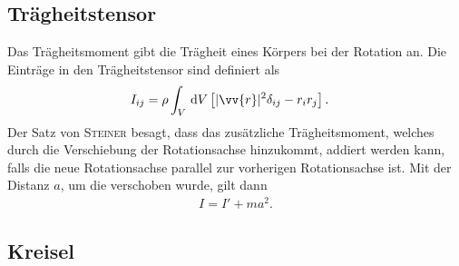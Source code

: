 \subsection{Trägheitstensor}
Das Trägheitsmoment gibt die Trägheit eines Körpers bei der Rotation an.
Die Einträge in den Trägheitstensor sind definiert als
\begin{align} 
        I_{ij}&=\rho \int_{V}^{}\td V\left[|\vv{r}|^2\delta _{ij}-r_ir_j\right]
.\end{align} 
Der Satz von \textsc{Steiner} besagt, dass das zusätzliche Trägheitsmoment, welches durch die Verschiebung der Rotationsachse hinzukommt, addiert werden kann, falls die neue Rotationsachse parallel zur vorherigen Rotationsachse ist.
Mit der Distanz $a$, um die verschoben wurde, gilt dann
\begin{align} 
        I=I'+ma^2
.\end{align} 

\subsection{Kreisel}
